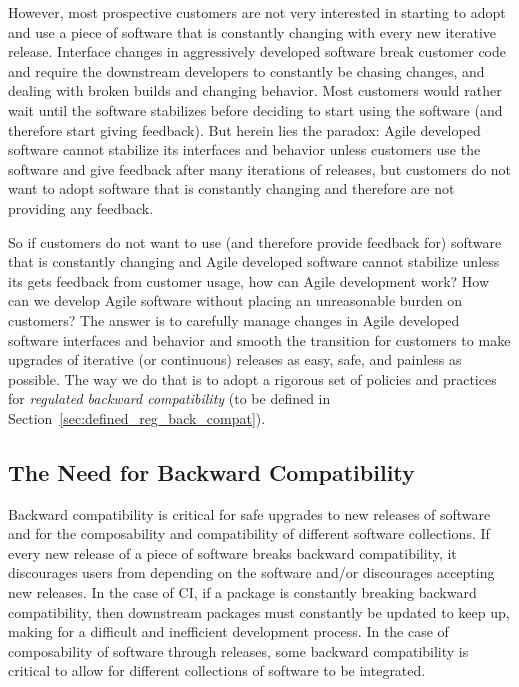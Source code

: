 \documentclass[11pt]{SANDreport}
\begin{document}
However, most prospective customers are not very interested in
starting to adopt and use a piece of software that is constantly
changing with every new iterative release.  Interface changes in
aggressively developed software break customer code and require the
downstream developers to constantly be chasing changes, and dealing
with broken builds and changing behavior.  Most customers would rather
wait until the software stabilizes before deciding to start using the
software (and therefore start giving feedback).  But herein lies the
paradox: Agile developed software cannot stabilize its interfaces and
behavior unless customers use the software and give feedback after
many iterations of releases, but customers do not want to adopt
software that is constantly changing and therefore are not providing
any feedback.

So if customers do not want to use (and therefore provide feedback
for) software that is constantly changing and Agile developed software
cannot stabilize unless its gets feedback from customer usage, how can
Agile development work?  How can we develop Agile software without
placing an unreasonable burden on customers?  The answer is to
carefully manage changes in Agile developed software interfaces and
behavior and smooth the transition for customers to make upgrades of
iterative (or continuous) releases as easy, safe, and painless as
possible.  The way we do that is to adopt a rigorous set of policies
and practices for {}\textit{regulated backward compatibility} (to be
defined in Section~\ref{sec:defined_reg_back_compat}).


%
{}\subsection{The Need for Backward Compatibility}
\label{sec:need_for_back_compat}
%

Backward compatibility is critical for safe upgrades to new releases
of software and for the composability and compatibility of different
software collections.  If every new release of a piece of software
breaks backward compatibility, it discourages users from depending on
the software and/or discourages accepting new releases.  In the case
of CI, if a package is constantly breaking backward compatibility, then
downstream packages must constantly be updated to keep up, making for
a difficult and inefficient development process.  In the case of
composability of software through releases, some backward
compatibility is critical to allow for different collections of
software to be integrated.
\end{document}

